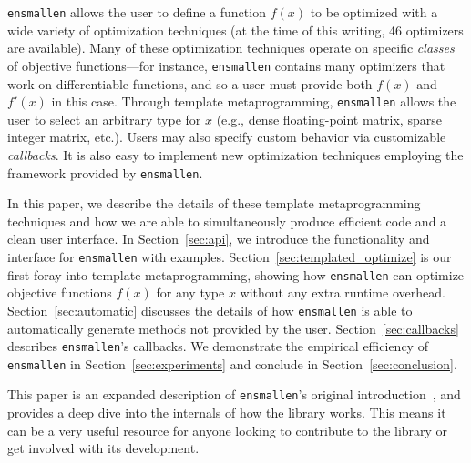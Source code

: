 {\tt ensmallen} allows the user to define a function $f(x)$ to be optimized with
a wide variety of optimization techniques (at the time of this writing, 46
optimizers are available).  Many of these optimization techniques operate on
specific {\it classes} of objective functions---for instance, {\tt ensmallen}
contains many optimizers that work on differentiable functions, and so a user
must provide both $f(x)$ and $f'(x)$ in this case.
Through template metaprogramming, {\tt ensmallen} allows the user to select
an arbitrary type for $x$ (e.g., dense floating-point matrix, sparse integer matrix, etc.).
Users may also specify custom behavior via customizable {\it callbacks}.
It is also easy to implement new optimization techniques employing the framework provided by {\tt ensmallen}.

In this paper, we describe the details of these template metaprogramming
techniques and how we are able to simultaneously produce efficient code and a
clean user interface.  In Section~\ref{sec:api}, we introduce the functionality
and interface for {\tt ensmallen} with examples.
Section~\ref{sec:templated_optimize} is our first foray into template
metaprogramming, showing how {\tt ensmallen} can optimize objective functions
$f(x)$ for any type $x$ without any extra runtime overhead.
Section~\ref{sec:automatic} discusses the details of how {\tt ensmallen} is able
to automatically generate methods not provided by the user.
Section~\ref{sec:callbacks} describes {\tt ensmallen}'s callbacks.
We demonstrate the empirical efficiency of {\tt ensmallen} in
Section~\ref{sec:experiments} and conclude in Section~\ref{sec:conclusion}.

This paper is an expanded description of {\tt ensmallen}'s original
introduction~\cite{ensmallen2018, curtin2017generic}, and provides a deep dive
into the internals of how the library works.  This means it can be a very useful
resource for anyone looking to contribute to the library or get involved with
its development.
